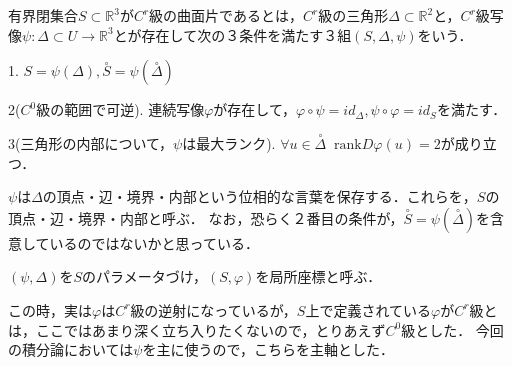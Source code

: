 \documentclass[uplatex, dvipdfmx]{jsreport}
\begin{document}
\begin{definition}[曲面片]
    有界閉集合$S\subset\mathbb{R}^3$が$C^r$級の曲面片であるとは，$C^r$級の三角形$\Delta\subset\mathbb{R}^2$と，$C^r$級写像$\psi:\Delta\subset U\to\mathbb{R}^3$とが存在して次の３条件を満たす３組$(S,\Delta,\psi)$をいう．

    1. $S=\psi(\Delta),\overset{\circ}{S}=\psi(\overset{\circ}{\Delta})$

    2($C^0$級の範囲で可逆). 連続写像$\varphi$が存在して，$\varphi\circ\psi=id_\Delta, \psi\circ\varphi=id_S$を満たす．

    3(三角形の内部について，$\psi$は最大ランク). $\forall u\in\overset{\circ}{\Delta}\;\; \mathrm{rank}D\varphi(u)=2$が成り立つ．
\end{definition}
\begin{remark}
    $\psi$は$\Delta$の頂点・辺・境界・内部という位相的な言葉を保存する．これらを，$S$の頂点・辺・境界・内部と呼ぶ．
    なお，恐らく２番目の条件が，$\overset{\circ}{S}=\psi(\overset{\circ}{\Delta})$を含意しているのではないかと思っている．

    $(\psi,\Delta)$を$S$のパラメータづけ，$(S,\varphi)$を局所座標と呼ぶ．

    この時，実は$\varphi$は$C^r$級の逆射になっているが，$S$上で定義されている$\varphi$が$C^r$級とは，ここではあまり深く立ち入りたくないので，とりあえず$C^0$級とした．
    今回の積分論においては$\psi$を主に使うので，こちらを主軸とした．
\end{remark}
\end{document}
